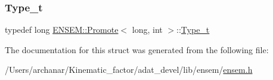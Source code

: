 \subsubsection{\texorpdfstring{Type\_t}{Type\_t}\hspace{0.1cm}{\footnotesize\ttfamily [2/2]}}
{\footnotesize\ttfamily typedef long \mbox{\hyperlink{structENSEM_1_1Promote}{E\+N\+S\+E\+M\+::\+Promote}}$<$ long, int $>$\+::\mbox{\hyperlink{structENSEM_1_1Promote_3_01long_00_01int_01_4_a98c4c916d9b142fd471add21a6769683}{Type\+\_\+t}}}



The documentation for this struct was generated from the following file\+:\begin{DoxyCompactItemize}
\item 
/\+Users/archanar/\+Kinematic\+\_\+factor/adat\+\_\+devel/lib/ensem/\mbox{\hyperlink{lib_2ensem_2ensem_8h}{ensem.\+h}}\end{DoxyCompactItemize}

